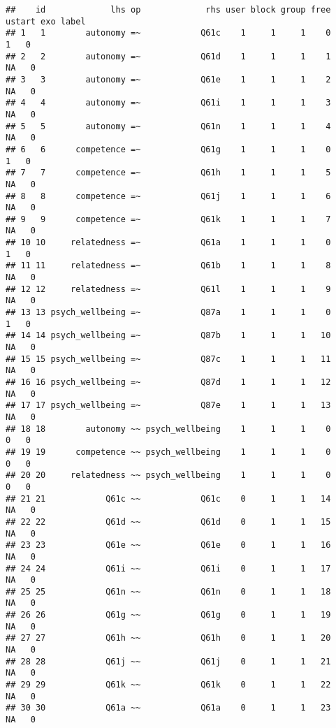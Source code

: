 \documentclass[
]{article}
\begin{document}
\begin{verbatim}
##    id             lhs op             rhs user block group free ustart exo label
## 1   1        autonomy =~            Q61c    1     1     1    0      1   0      
## 2   2        autonomy =~            Q61d    1     1     1    1     NA   0      
## 3   3        autonomy =~            Q61e    1     1     1    2     NA   0      
## 4   4        autonomy =~            Q61i    1     1     1    3     NA   0      
## 5   5        autonomy =~            Q61n    1     1     1    4     NA   0      
## 6   6      competence =~            Q61g    1     1     1    0      1   0      
## 7   7      competence =~            Q61h    1     1     1    5     NA   0      
## 8   8      competence =~            Q61j    1     1     1    6     NA   0      
## 9   9      competence =~            Q61k    1     1     1    7     NA   0      
## 10 10     relatedness =~            Q61a    1     1     1    0      1   0      
## 11 11     relatedness =~            Q61b    1     1     1    8     NA   0      
## 12 12     relatedness =~            Q61l    1     1     1    9     NA   0      
## 13 13 psych_wellbeing =~            Q87a    1     1     1    0      1   0      
## 14 14 psych_wellbeing =~            Q87b    1     1     1   10     NA   0      
## 15 15 psych_wellbeing =~            Q87c    1     1     1   11     NA   0      
## 16 16 psych_wellbeing =~            Q87d    1     1     1   12     NA   0      
## 17 17 psych_wellbeing =~            Q87e    1     1     1   13     NA   0      
## 18 18        autonomy ~~ psych_wellbeing    1     1     1    0      0   0      
## 19 19      competence ~~ psych_wellbeing    1     1     1    0      0   0      
## 20 20     relatedness ~~ psych_wellbeing    1     1     1    0      0   0      
## 21 21            Q61c ~~            Q61c    0     1     1   14     NA   0      
## 22 22            Q61d ~~            Q61d    0     1     1   15     NA   0      
## 23 23            Q61e ~~            Q61e    0     1     1   16     NA   0      
## 24 24            Q61i ~~            Q61i    0     1     1   17     NA   0      
## 25 25            Q61n ~~            Q61n    0     1     1   18     NA   0      
## 26 26            Q61g ~~            Q61g    0     1     1   19     NA   0      
## 27 27            Q61h ~~            Q61h    0     1     1   20     NA   0      
## 28 28            Q61j ~~            Q61j    0     1     1   21     NA   0      
## 29 29            Q61k ~~            Q61k    0     1     1   22     NA   0      
## 30 30            Q61a ~~            Q61a    0     1     1   23     NA   0      

\end{verbatim}
\end{document}
